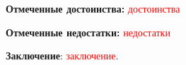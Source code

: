 \documentclass[master, fontsize=12pt]{diploma}
\begin{document}
\fillReviewHeader

\textbf{Отмеченные достоинства:} \textcolor{red}{достоинства}

\textbf{Отмеченные недостатки:} \textcolor{red}{недостатки}

\textbf{Заключение}: \textcolor{red}{заключение}.

\makeReviewSignature
\end{document}
